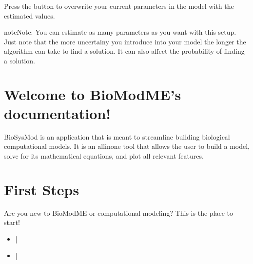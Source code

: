 \documentclass[letterpaper,10pt,english]{sphinxmanual}
\begin{document}
\sphinxAtStartPar
Press the  button to overwrite your current parameters in the model
with the estimated values.

\begin{sphinxadmonition}{note}{Note:}
\sphinxAtStartPar
You can estimate as many parameters as you want with this setup.
Just note that the more uncertainy you introduce into your model the
longer the algorithm can take to find a solution. It can also affect
the probability of finding a solution.
\end{sphinxadmonition}


\chapter{Welcome to BioModME’s documentation!}
\label{\detokenize{index:welcome-to-biomodme-s-documentation}}
\sphinxAtStartPar
BioSysMod is an application that is meant to streamline building biological
computational models. It is an all\sphinxhyphen{}in\sphinxhyphen{}one tool that allows the user to build
a model, solve for its mathematical equations, and plot all relevant features.


\chapter{First Steps}
\label{\detokenize{index:first-steps}}
\sphinxAtStartPar
Are you new to BioModME or computational modeling? This is the place to start!
\begin{itemize}
\item {} 
\sphinxAtStartPar
{}
{\hyperref[\detokenize{pages/gettingStarted/useonline::doc}]{}} |
{\hyperref[\detokenize{pages/gettingStarted/downloadtoR::doc}]{}}

\item {} 
\sphinxAtStartPar
{}
{\hyperref[\detokenize{pages/tutorial_sc_index::doc}]{}} |
{\hyperref[\detokenize{pages/tutorial_mc_index::doc}]{}}

\end{itemize}
\end{document}
